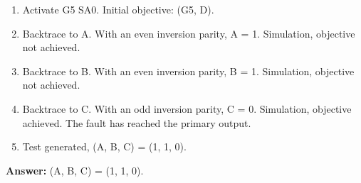 
\begin{enumerate}
  \item Activate G5 SA0. Initial objective: (G5, D).
  \item Backtrace to A. With an even inversion parity, A = 1. Simulation, objective not achieved.
  \item Backtrace to B. With an even inversion parity, B = 1. Simulation, objective not achieved.
  \item Backtrace to C. With an odd inversion parity, C = 0. Simulation, objective achieved. The fault has reached the primary output.
  \item Test generated, (A, B, C) = (1, 1, 0).

\end{enumerate}

\textbf{Answer:} (A, B, C) = (1, 1, 0).

